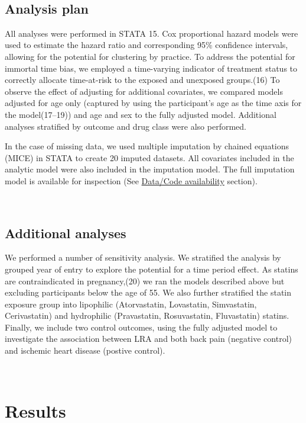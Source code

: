 \documentclass[
]{article}
\begin{document}
~

\hypertarget{analysis-plan}{%
\subsection{Analysis plan}\label{analysis-plan}}

All analyses were performed in STATA 15. Cox proportional hazard models were used to estimate the hazard ratio and corresponding 95\% confidence intervals, allowing for the potential for clustering by practice. To address the potential for immortal time bias, we employed a time-varying indicator of treatment status to correctly allocate time-at-risk to the exposed and unexposed groups.(16) To observe the effect of adjusting for additional covariates, we compared models adjusted for age only (captured by using the participant's age as the time axis for the model(17--19)) and age and sex to the fully adjusted model. Additional analyses stratified by outcome and drug class were also performed.

In the case of missing data, we used multiple imputation by chained equations (MICE) in STATA to create 20 imputed datasets. All covariates included in the analytic model were also included in the imputation model. The full imputation model is available for inspection (See \protect\hyperlink{data-code-avail}{Data/Code availability} section).

~

\hypertarget{additional-analyses}{%
\subsection{Additional analyses}\label{additional-analyses}}

We performed a number of sensitivity analysis. We stratified the analysis by grouped year of entry to explore the potential for a time period effect. As statins are contraindicated in pregnancy,(20) we ran the models described above but excluding participants below the age of 55. We also further stratified the statin exposure group into lipophilic (Atorvastatin, Lovastatin, Simvastatin, Cerivastatin) and hydrophilic (Pravastatin, Rosuvastatin, Fluvastatin) statins. Finally, we include two control outcomes, using the fully adjusted model to investigate the association between LRA and both back pain (negative control) and ischemic heart disease (postive control).

~

\newpage

\hypertarget{results}{%
\section{Results}\label{results}}
\end{document}
